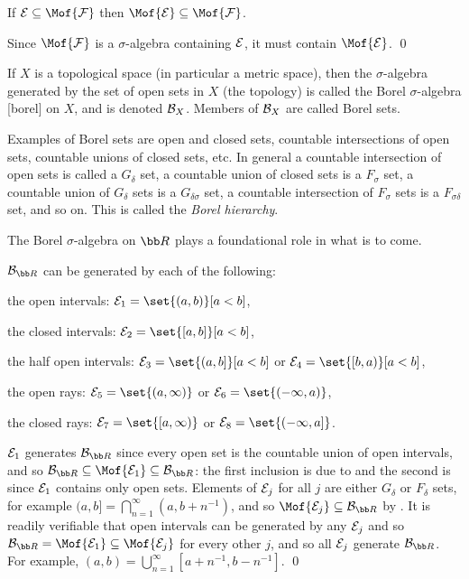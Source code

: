 \blemm[name=salginc]

    If ${\cal E}\subseteq\Mof{{\cal F}}$ then $\Mof{{\cal E}}\subseteq\Mof{{\cal F}}$.

\elemm

Since $\Mof{{\cal F}}$ is a $\sigma$-algebra containing ${\cal E}$, it must contain $\Mof{{\cal E}}$.
\qed

\bdefn

    If $X$ is a topological space (in particular a metric space), then the $\sigma$-algebra generated by the set of open sets in $X$ (the topology) is called the {\emphcolor Borel $\sigma$-algebra}%
    [borel] on $X$, and is denoted ${\cal B}_X$.
    Members of ${\cal B}_X$ are called {\emphcolor Borel sets}.

\edefn

Examples of Borel sets are open and closed sets, countable intersections of open sets, countable unions of closed sets, etc.
In general a countable intersection of open sets is called a $G_\delta$ set, a countable union of closed sets is a $F_\sigma$ set, a countable union of $G_\delta$ sets is a $G_{\delta\sigma}$ set, a 
countable intersection of $F_\sigma$ sets is a $F_{\sigma\delta}$ set, and so on.
This is called the {\it Borel hierarchy}.

The Borel $\sigma$-algebra on ${\bb R}$ plays a foundational role in what is to come.

\bprop

    ${\cal B}_{\bb R}$ can be generated by each of the following:
    \benum
        \item the open intervals: ${\cal E}_1=\set{(a,b)}[a<b]$,
        \item the closed intervals: ${\cal E}_2=\set{[a,b]}[a<b]$,
        \item the half open intervals: ${\cal E}_3=\set{(a,b]}[a<b]$ or ${\cal E}_4=\set{[b,a)}[a<b]$,
        \item the open rays: ${\cal E}_5=\set{(a,\infty)}$ or ${\cal E}_6=\set{(-\infty,a)}$,
        \item the closed rays: ${\cal E}_7=\set{[a,\infty)}$ or ${\cal E}_8=\set{(-\infty,a]}$.
    \eenum

\eprop

${\cal E}_1$ generates ${\cal B}_{\bb R}$ since every open set is the countable union of open intervals, and so ${\cal B}_{\bb R}\subseteq\Mof{{\cal E}_1}\subseteq{\cal B}_{\bb R}$: the first inclusion
is due to  and the second is since ${\cal E}_1$ contains only open sets.
Elements of ${\cal E}_j$ for all $j$ are either $G_\delta$ or $F_\delta$ sets, for example $(a,b]=\bigcap_{n=1}^\infty(a,b+n^{-1})$, and so $\Mof{{\cal E}_j}\subseteq{\cal B}_{\bb R}$ by
.
It is readily verifiable that open intervals can be generated by any ${\cal E}_j$ and so ${\cal B}_{\bb R}=\Mof{{\cal E}_1}\subseteq\Mof{{\cal E}_j}$ for every other $j$, and so all ${\cal E}_j$ generate
${\cal B}_{\bb R}$.
For example, $(a,b)=\bigcup_{n=1}^\infty[a+n^{-1},b-n^{-1}]$.
\qed

